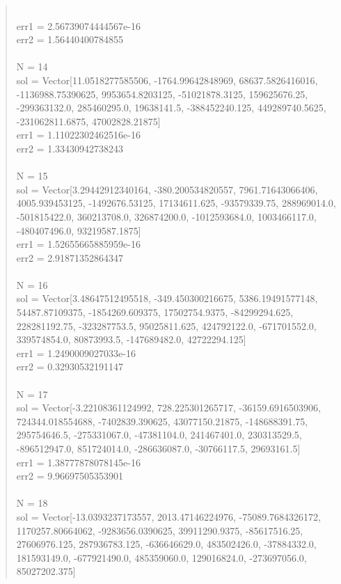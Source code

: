 \documentclass[letterpaper,12pt]{article}
\begin{document}
\begin{quote}
\\err1 = 2.56739074444567e-16
\\err2 = 1.56440400784855
\\
\\N = 14
\\sol = Vector[11.0518277585506, -1764.99642848969, 68637.5826416016, -1136988.75390625, 9953654.8203125, -51021878.3125, 159625676.25, -299363132.0, 285460295.0, 19638141.5, -388452240.125, 449289740.5625, -231062811.6875, 47002828.21875]
\\err1 = 1.11022302462516e-16
\\err2 = 1.33430942738243
\\
\\N = 15
\\sol = Vector[3.29442912340164, -380.200534820557, 7961.71643066406, 4005.939453125, -1492676.53125, 17134611.625, -93579339.75, 288969014.0, -501815422.0, 360213708.0, 326874200.0, -1012593684.0, 1003466117.0, -480407496.0, 93219587.1875]
\\err1 = 1.52655665885959e-16
\\err2 = 2.91871352864347
\\
\\N = 16
\\sol = Vector[3.48647512495518, -349.450300216675, 5386.19491577148, 54487.87109375, -1854269.609375, 17502754.9375, -84299294.625, 228281192.75, -323287753.5, 95025811.625, 424792122.0, -671701552.0, 339574854.0, 80873993.5, -147689482.0, 42722294.125]
\\err1 = 1.2490009027033e-16
\\err2 = 0.32930532191147
\\
\\N = 17
\\sol = Vector[-3.22108361124992, 728.225301265717, -36159.6916503906, 724344.018554688, -7402839.390625, 43077150.21875, -148688391.75, 295754646.5, -275331067.0, -47381104.0, 241467401.0, 230313529.5, -896512947.0, 851724014.0, -286636087.0, -30766117.5, 29693161.5]
\\err1 = 1.38777878078145e-16
\\err2 = 9.96697505353901
\\
\\N = 18
\\sol = Vector[-13.0393237173557, 2013.47146224976, -75089.7684326172, 1170257.80664062, -9283656.0390625, 39911290.9375, -85617516.25, 27606976.125, 287936783.125, -636646629.0, 483502426.0, -37884332.0, 181593149.0, -677921490.0, 485359060.0, 129016824.0, -273697056.0, 85027202.375]

\end{quote}
\end{document}
